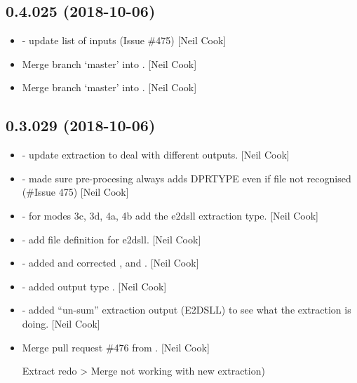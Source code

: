 \documentclass[a4paper,10pt,english]{report}
\begin{document}
\subsection{0.4.025 (2018-10-06)}
\label{\detokenize{misc/changelog:id302}}\begin{itemize}
\item {} 
 - update list of inputs (Issue \#475) {[}Neil Cook{]}

\item {} 
Merge branch ‘master’ into . {[}Neil Cook{]}

\item {} 
Merge branch ‘master’ into . {[}Neil Cook{]}

\end{itemize}


\subsection{0.3.029 (2018-10-06)}
\label{\detokenize{misc/changelog:id303}}\begin{itemize}
\item {} 
 - update extraction to deal with different
outputs. {[}Neil Cook{]}

\item {} 
 - made sure pre-procesing always adds DPRTYPE even if
file not recognised (\#Issue 475) {[}Neil Cook{]}

\item {} 
 - for modes 3c, 3d, 4a, 4b add the e2dsll extraction
type. {[}Neil Cook{]}

\item {} 
 - add file definition for e2dsll. {[}Neil Cook{]}

\item {} 
 - added and corrected ,  and
. {[}Neil Cook{]}

\item {} 
 - added output type . {[}Neil Cook{]}

\item {} 
 - added “un-sum” extraction output (E2DSLL)
to see what the extraction is doing. {[}Neil Cook{]}

\item {} 
Merge pull request \#476 from . {[}Neil Cook{]}

Extract redo \textendash{}\textgreater{} Merge  not working with new extraction)

\end{itemize}
\end{document}

